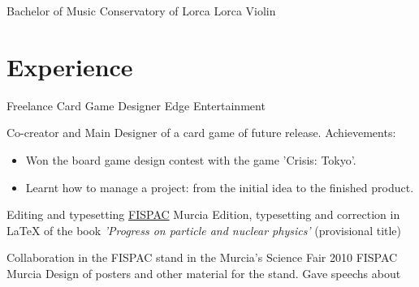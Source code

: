 \documentclass[11pt,a4paper,roman]{moderncv}
\begin{document}
	{Bachelor of Music}
	{Conservatory of Lorca}
	{Lorca}
	{}
	{Violin}




\section{Experience}

	{Freelance Card Game Designer}
	{Edge Entertainment}
	{}
	{}
	{Co-creator and Main Designer of a card game of future release.\newline{}
Achievements:
\begin{itemize}
	\item Won the board game design contest with the game 'Crisis: Tokyo'.
	\item Learnt how to manage a project: from the initial idea to the finished product.
\end{itemize}}

	{Editing and typesetting}
	{\href{http://www.um.es/fispac/}{FISPAC}}
	{Murcia}
	{}
	{Edition, typesetting and correction in \LaTeX{} of the book \textit{'Progress on particle and nuclear physics'} (provisional title)\newline{}}

	{Collaboration in the FISPAC stand in the Murcia's Science Fair 2010}
	{FISPAC}
	{Murcia}
	{}
	{Design of posters and other material for the stand. Gave speechs about}

\end{document}
